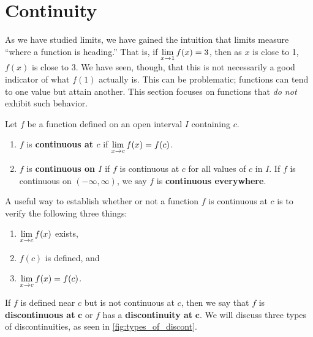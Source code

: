 \section{Continuity}\label{sec:continuity}

As we have studied limits, we have gained the intuition that limits measure ``where a function is heading.'' That is, if $\displaystyle \lim_{x\to 1} f(x) = 3$, then as $x$ is close to 1, $f(x)$ is close to 3. We have seen, though, that this is not necessarily a good indicator of what $f(1)$ actually is. This can be problematic; functions can tend to one value but attain another. This section focuses on functions that \emph{do not} exhibit such behavior.

\begin{definition}\label{def:continuous}%
Let $f$ be a function defined on an open interval $I$ containing $c$. 
\begin{enumerate}
	\item	$f$ is \textbf{continuous at $c$} if $\displaystyle \lim_{x\to c}f(x) = f(c)	$.
	\item	$f$ is \textbf{continuous on $I$} if $f$ is continuous at $c$ for all values of $c$ in $I$. If $f$ is continuous on $(-\infty,\infty)$, we say $f$ is \textbf{continuous everywhere}.
\end{enumerate}
\end{definition}

A useful way to establish whether or not a function $f$ is continuous at $c$ is to verify the following three things:
\begin{enumerate}
	\item	$\displaystyle \lim_{x\to c} f(x)$ exists,
	\item	$f(c)$ is defined, and 
	\item	$\displaystyle \lim_{x\to c} f(x) = f(c)$.
\end{enumerate}

If $f$ is defined near $c$ but is not continuous at $c$, then we say that $f$ is \textbf{discontinuous at} $\mathbf{c}$ or $f$ has a \textbf{discontinuity at} $\mathbf{c}$. We will discuss three types of discontinuities, as seen in \autoref{fig:types_of_discont}.

